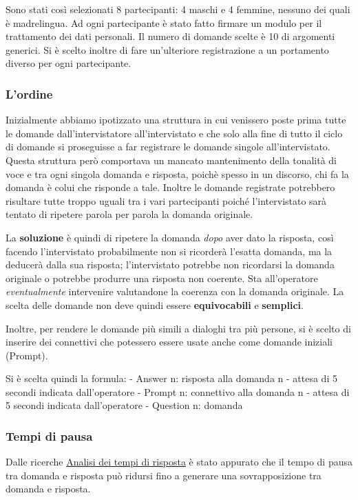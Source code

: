 \documentclass[
]{article}
\begin{document}
Sono stati così selezionati 8 partecipanti: 4 maschi e 4 femmine, nessuno dei quali è madrelingua. Ad ogni partecipante è stato fatto firmare un modulo per il trattamento dei dati personali. Il numero di domande scelte è 10 di argomenti generici. Si è scelto inoltre di fare un'ulteriore registrazione a un portamento diverso per ogni partecipante.

\subsubsection{L'ordine}\label{lordine}

Inizialmente abbiamo ipotizzato una struttura in cui venissero poste prima tutte le domande dall'intervistatore all'intervistato e che solo alla fine di tutto il ciclo di domande si proseguisse a far registrare le domande singole all'intervistato. Questa struttura però comportava un mancato mantenimento della tonalità di voce e tra ogni singola domanda e risposta, poichè spesso in un discorso, chi fa la domanda è colui che risponde a tale. Inoltre le domande registrate potrebbero risultare tutte troppo uguali tra i vari partecipanti poiché l'intervistato sarà tentato di ripetere parola per parola la domanda originale.

La \textbf{soluzione} è quindi di ripetere la domanda \emph{dopo} aver dato la risposta, così facendo l'intervistato probabilmente non si ricorderà l'esatta domanda, ma la deducerà dalla sua risposta; l'intervistato potrebbe non ricordarsi la domanda originale o potrebbe produrre una risposta non coerente. Sta all'operatore \emph{eventualmente} intervenire valutandone la coerenza con la domanda originale. La scelta delle domande non deve quindi essere \textbf{equivocabili} e \textbf{semplici}.

Inoltre, per rendere le domande più simili a dialoghi tra più persone, si è scelto di inserire dei connettivi che potessero essere usate anche come domande iniziali (Prompt).

Si è scelta quindi la formula: - Answer n: risposta alla domanda n - attesa di 5 secondi indicata dall'operatore - Prompt n: connettivo alla domanda n - attesa di 5 secondi indicata dall'operatore - Question n: domanda

\subsubsection{Tempi di pausa}\label{tempi-di-pausa}

Dalle ricerche \hyperref[analisi-dei-tempi-di-risposta]{Analisi dei tempi di risposta} è stato appurato che il tempo di pausa tra domanda e risposta può ridursi fino a generare una sovrapposizione tra domanda e risposta.
\end{document}
